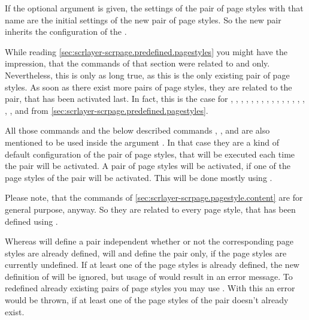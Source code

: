 If the optional argument  is given, the settings of the
pair of page styles with that name are the initial settings of the new pair of
page styles. So the new pair inherits the configuration of the .

While reading \autoref{sec:scrlayer-scrpage.predefined.pagestyles} you might
have the impression, that the commands of that section were related to
 and  only. Nevertheless,
this is only as long true, as this is the only existing pair of page
styles. As soon as there exist more pairs of page styles, they are related to
the pair, that has been activated last. In fact, this is the case for , , , ,
, , , ,
, , , , ,
, , , , and 
from \autoref{sec:scrlayer-scrpage.predefined.pagestyles}.

All those commands and the below described commands , , and
 are also mentioned to be used inside the
argument . In that case they are a kind of default
configuration of the pair of page styles, that will be executed each time the
pair will be activated. A pair of page styles will be activated, if one of the
page styles of the pair will be activated. This will be done mostly using
.

Please note, that the commands of
\autoref{sec:scrlayer-scrpage.pagestyle.content} are for general purpose,
anyway. So they are related to every page style, that has been defined using
.

Whereas  will define a pair independent whether or
not the corresponding page styles are already defined, will
 and  define the pair
only, if the page styles are currently undefined. If at least one of the page
styles is already defined, the new definition of
 will be ignored, but usage of
 would result in an error message. To redefined
already existing pairs of page styles you may use
. With this an error would be thrown, if at least
one of the page styles of the pair doesn't already exist.%
%
%
%
%

